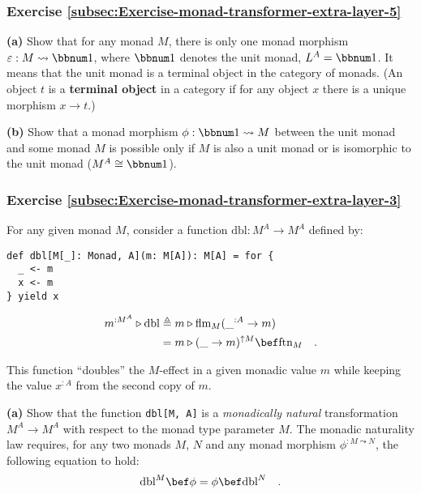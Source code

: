 \subsubsection{Exercise \label{subsec:Exercise-monad-transformer-extra-layer-5}\ref{subsec:Exercise-monad-transformer-extra-layer-5}}

\textbf{(a)} Show that for any monad $M$, there is only one monad
morphism $\varepsilon:M\leadsto\bbnum 1$, where $\bbnum 1$ denotes
the unit monad, $L^{A}=\bbnum 1$. It means that the unit monad is
a terminal object in the category of monads. (An object $t$ is a
\textbf{terminal object} in a category if for any object $x$ there
is a unique morphism $x\rightarrow t$.)

\textbf{(b)} Show that a monad morphism $\phi:\bbnum 1\leadsto M$
between the unit monad and some monad $M$ is possible only if $M$
is also a unit monad or is isomorphic to the unit monad ($M^{A}\cong\bbnum 1$).

\subsubsection{Exercise \label{subsec:Exercise-monad-transformer-extra-layer-3}\ref{subsec:Exercise-monad-transformer-extra-layer-3}}

For any given monad $M$, consider a function $\text{dbl}:M^{A}\rightarrow M^{A}$
defined by:
\begin{lstlisting}
def dbl[M[_]: Monad, A](m: M[A]): M[A] = for {
  _ <- m
  x <- m
} yield x
\end{lstlisting}
\begin{align*}
m^{:M^{A}}\triangleright\text{dbl} & \triangleq m\triangleright\text{flm}_{M}(\_^{:A}\rightarrow m)\\
 & =m\triangleright(\_\rightarrow m)^{\uparrow M}\bef\text{ftn}_{M}\quad.
\end{align*}

This function \textsf{``}doubles\textsf{''} the $M$-effect in a given monadic value
$m$ while keeping the value $x^{:A}$ from the second copy of $m$.

\textbf{(a)} Show that the function \lstinline!dbl[M, A]! is a \emph{monadically
natural} transformation $M^{A}\rightarrow M^{A}$ with respect to
the monad type parameter $M$. The monadic naturality law requires,
for any two monads $M$, $N$ and any monad morphism $\phi^{:M\leadsto N}$,
the following equation to hold:
\[
\text{dbl}^{M}\bef\phi=\phi\bef\text{dbl}^{N}\quad.
\]

